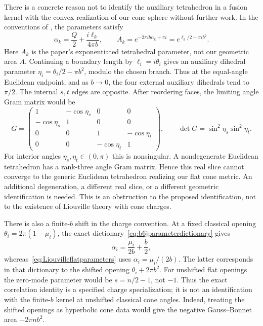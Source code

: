 \documentclass[11pt,a4paper]{article}
\numberwithin{equation}{section}
\theoremstyle{definition}
\theoremstyle{remark}
\begin{document}
There is a concrete reason not to identify the auxiliary
tetrahedron in a fusion kernel with the convex realization of
our cone sphere without further work. In the conventions of
\cite[Sections~3--5]{TeschnerVartanov}, the parameters satisfy
\begin{equation}
 \alpha_k=\frac Q2+\frac{i\ell_k}{4\pi b},\qquad
 A_k=e^{-2\pi ib\alpha_k+\pi i}
           =e^{\ell_k/2-\pi ib^2}.
 \label{eq:b6jparameterdictionary}
\end{equation}
Here $A_k$ is the paper's exponentiated tetrahedral parameter,
not our geometric area $A$. Continuing a boundary length by
$\ell_i=i\theta_i$ gives an auxiliary dihedral parameter
$\eta_i=\theta_i/2-\pi b^2$, modulo the chosen branch.
Thus at the equal-angle Euclidean endpoint, and as $b\to0$,
the four external auxiliary dihedrals tend to $\pi/2$.
The internal $s,t$ edges are opposite. After reordering faces,
the limiting angle Gram matrix would be
\begin{equation}
 G=\begin{pmatrix}
 1&-\cos\eta_s&0&0\\
 -\cos\eta_s&1&0&0\\
 0&0&1&-\cos\eta_t\\
 0&0&-\cos\eta_t&1
 \end{pmatrix},\qquad
 \det G=\sin^2\eta_s\sin^2\eta_t.
 \label{eq:auxiliaryGramobstruction}
\end{equation}
For interior angles $\eta_s,\eta_t\in(0,\pi)$ this is
nonsingular. A nondegenerate Euclidean tetrahedron has a
rank-three angle Gram matrix. Hence this real slice cannot
converge to the generic Euclidean tetrahedron realizing our
flat cone metric. An additional degeneration, a different
real slice, or a different geometric identification is needed.
This is an obstruction to the proposed identification, not
to the existence of Liouville theory with cone charges.

There is also a finite-$b$ shift in the charge convention.
At a fixed classical opening $\theta_i=2\pi(1-\mu_i)$, the
exact dictionary~\eqref{eq:b6jparameterdictionary} gives
\[
 \alpha_i=\frac{\mu_i}{2b}+\frac b2,
\]
whereas~\eqref{eq:Liouvilleflatparameters} uses
$\alpha_i=\mu_i/(2b)$. The latter corresponds in that
dictionary to the shifted opening $\theta_i+2\pi b^2$.
For unshifted flat openings the zero-mode parameter would be
$s=n/2-1$, not $-1$. Thus the exact correlation identity is
a specified charge specialization; it is not an identification
with the finite-$b$ kernel at unshifted classical cone angles.
Indeed, treating the shifted openings as hyperbolic cone data
would give the negative Gauss--Bonnet area $-2\pi n b^2$.
\end{document}
